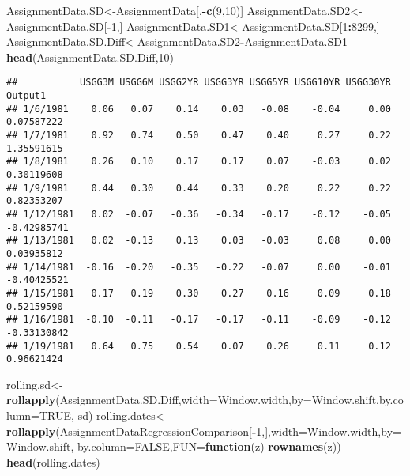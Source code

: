 \documentclass[]{article}
\newenvironment{Shaded}{\begin{snugshade}}{\end{snugshade}}
\newcommand{\KeywordTok}[1]{\textcolor[rgb]{0.13,0.29,0.53}{\textbf{#1}}}
\newcommand{\DataTypeTok}[1]{\textcolor[rgb]{0.13,0.29,0.53}{#1}}
\newcommand{\DecValTok}[1]{\textcolor[rgb]{0.00,0.00,0.81}{#1}}
\newcommand{\OtherTok}[1]{\textcolor[rgb]{0.56,0.35,0.01}{#1}}
\newcommand{\ControlFlowTok}[1]{\textcolor[rgb]{0.13,0.29,0.53}{\textbf{#1}}}
\newcommand{\OperatorTok}[1]{\textcolor[rgb]{0.81,0.36,0.00}{\textbf{#1}}}
\newcommand{\NormalTok}[1]{#1}
\begin{document}
\begin{Shaded}
\begin{Highlighting}[]
\NormalTok{AssignmentData.SD<-AssignmentData[,}\OperatorTok{-}\KeywordTok{c}\NormalTok{(}\DecValTok{9}\NormalTok{,}\DecValTok{10}\NormalTok{)]}
\NormalTok{AssignmentData.SD2<-AssignmentData.SD[}\OperatorTok{-}\DecValTok{1}\NormalTok{,]}
\NormalTok{AssignmentData.SD1<-AssignmentData.SD[}\DecValTok{1}\OperatorTok{:}\DecValTok{8299}\NormalTok{,]}
\NormalTok{AssignmentData.SD.Diff<-AssignmentData.SD2}\OperatorTok{-}\NormalTok{AssignmentData.SD1}
\KeywordTok{head}\NormalTok{(AssignmentData.SD.Diff,}\DecValTok{10}\NormalTok{)}
\end{Highlighting}
\end{Shaded}

\begin{verbatim}
##           USGG3M USGG6M USGG2YR USGG3YR USGG5YR USGG10YR USGG30YR     Output1
## 1/6/1981    0.06   0.07    0.14    0.03   -0.08    -0.04     0.00  0.07587222
## 1/7/1981    0.92   0.74    0.50    0.47    0.40     0.27     0.22  1.35591615
## 1/8/1981    0.26   0.10    0.17    0.17    0.07    -0.03     0.02  0.30119608
## 1/9/1981    0.44   0.30    0.44    0.33    0.20     0.22     0.22  0.82353207
## 1/12/1981   0.02  -0.07   -0.36   -0.34   -0.17    -0.12    -0.05 -0.42985741
## 1/13/1981   0.02  -0.13    0.13    0.03   -0.03     0.08     0.00  0.03935812
## 1/14/1981  -0.16  -0.20   -0.35   -0.22   -0.07     0.00    -0.01 -0.40425521
## 1/15/1981   0.17   0.19    0.30    0.27    0.16     0.09     0.18  0.52159590
## 1/16/1981  -0.10  -0.11   -0.17   -0.17   -0.11    -0.09    -0.12 -0.33130842
## 1/19/1981   0.64   0.75    0.54    0.07    0.26     0.11     0.12  0.96621424
\end{verbatim}

\begin{Shaded}
\begin{Highlighting}[]
\NormalTok{rolling.sd<-}\KeywordTok{rollapply}\NormalTok{(AssignmentData.SD.Diff,}\DataTypeTok{width=}\NormalTok{Window.width,}\DataTypeTok{by=}\NormalTok{Window.shift,}\DataTypeTok{by.column=}\OtherTok{TRUE}\NormalTok{, sd)}
\NormalTok{rolling.dates<-}\KeywordTok{rollapply}\NormalTok{(AssignmentDataRegressionComparison[}\OperatorTok{-}\DecValTok{1}\NormalTok{,],}\DataTypeTok{width=}\NormalTok{Window.width,}\DataTypeTok{by=}\NormalTok{Window.shift,}
                         \DataTypeTok{by.column=}\OtherTok{FALSE}\NormalTok{,}\DataTypeTok{FUN=}\ControlFlowTok{function}\NormalTok{(z) }\KeywordTok{rownames}\NormalTok{(z))}
\KeywordTok{head}\NormalTok{(rolling.dates)}
\end{Highlighting}
\end{Shaded}
\end{document}
